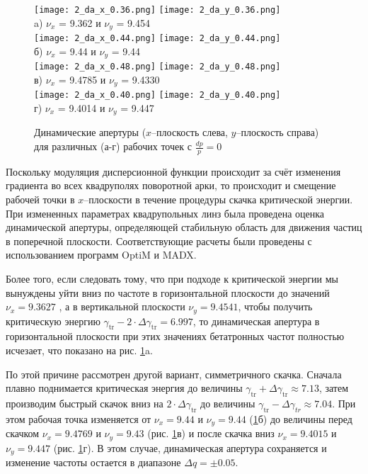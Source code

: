 \begin{figure}
   \centering 
   \texttt{[image: 2\_da\_x\_0.36.png]}
   \texttt{[image: 2\_da\_y\_0.36.png]}\\
a) $\nu_x$ = 9.362 и $\nu_y$ = 9.454\\
   \texttt{[image: 2\_da\_x\_0.44.png]}
   \texttt{[image: 2\_da\_y\_0.44.png]}\\
б) $\nu_x$ = 9.44 и $\nu_y$ = 9.44\\
   \texttt{[image: 2\_da\_x\_0.48.png]}
   \texttt{[image: 2\_da\_y\_0.48.png]}\\
в) $\nu_x$ = 9.4785 и $\nu_y$ = 9.4330\\
   \texttt{[image: 2\_da\_x\_0.40.png]}
   \texttt{[image: 2\_da\_y\_0.40.png]}\\
 г) $\nu_x$ = 9.4014 и $\nu_y$ = 9.447\\
    \caption{Динамические апертуры ($x$–плоскость слева, $y$–плоскость справа) для различных (а-г) рабочих точек с $\frac{dp}{p} = 0$}
     \label{fig:da_nica_jump}
\end{figure}

\par Поскольку модуляция дисперсионной функции происходит за счёт изменения градиента во всех квадруполях поворотной арки, то происходит и смещение рабочей точки в $x$--плоскости в течение процедуры скачка критической энергии. При измененных параметрах квадрупольных линз была проведена оценка динамической апертуры, определяющей стабильную область для движения частиц в поперечной плоскости. Соответствующие расчеты были проведены с использованием программ OptiM и MADX. 

\par Более того, если следовать тому, что при подходе к критической энергии мы вынуждены уйти вниз по частоте в горизонтальной плоскости до значений $\nu_x=9.3627$ , а в вертикальной плоскости $\nu_y=9.4541$, чтобы получить критическую энергию  $\gamma_{\textrm{tr}}-{2\cdot\Delta\gamma}_{\textrm{tr}}=6.997$, то динамическая апертура в горизонтальной плоскости при этих значениях бетатронных частот полностью исчезает, что показано на рис. \ref{fig:da_nica_jump}a.
 
\par По этой причине рассмотрен другой вариант, симметричного скачка. Сначала плавно поднимается критическая энергия до величины $\gamma_{\textrm{tr}}+{\Delta\gamma}_{\textrm{tr}}\approx 7.13$, затем производим быстрый скачок вниз на $2\cdot{\Delta\gamma}_{\textrm{tr}}$ до величины $\gamma_{\textrm{tr}}-{\Delta\gamma}_{tr}\approx7.04$. При этом рабочая точка изменяется от $\nu_x=9.44$ и $\nu_y=9.44$ (\ref{fig:da_nica_jump}б)  до величины перед скачком $\nu_x=9.4769$ и $\nu_y=9.43$ (рис. \ref{fig:da_nica_jump}в) и после скачка вниз $\nu_x=9.4015$ и $\nu_y=9.447$ (рис. \ref{fig:da_nica_jump}г). В этом случае, динамическая апертура сохраняется и изменение частоты остается в диапазоне $\Delta q = \pm 0.05$.

